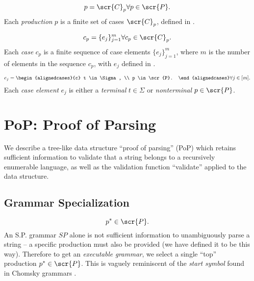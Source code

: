 \documentclass[10pt]{article}
\begin{document}
\begin{equation}
  \label{eq:p}
  p = \scr{C}_p \forall p \in \scr{P}.
\end{equation}
Each \textit{production} $p$ is a finite set of cases $\scr{C}_p$, defined in .

\begin{equation}
  \label{eq:cp}
  c_p = \{e_j\}_{j=1}^m \forall c_p \in \scr{C}_p.
\end{equation}
Each \textit{case} $c_p$ is a finite sequence of case elements $\{e_j\}_{j=1}^m$, where $m$ is the number of elements in the sequence $c_p$, with $e_j$ defined in .

\begin{equation}
  \label{eq:ej}
  e_j = \begin{alignedcases}{c}
    t \in \Sigma, \\
    p \in \scr{P}.
  \end{alignedcases} \forall j \in [m].
\end{equation}
Each \textit{case element} $e_j$ is either a \textit{terminal} $t \in \Sigma$ or \textit{nonterminal} $p \in \scr{P}$.

\section{PoP: Proof of Parsing}
\label{sec:proof-of-parsing}
We describe a tree-like data structure ``proof of parsing'' (PoP) which retains sufficient information to validate that a string belongs to a recursively enumerable language, as well as the validation function ``validate'' applied to the data structure.


\subsection{Grammar Specialization}
\label{sec:grammar-specialization}
\begin{equation}
  \label{eq:p-top}
  p^* \in \scr{P}.
\end{equation}
An S.P. grammar $SP$ alone is not sufficient information to unambiguously parse a string -- a specific production must also be provided (we have defined it to be this way). Therefore to get an \textit{executable grammar}, we select a single ``top'' production $p^* \in \scr{P}$. This is vaguely reminiscent of the \textit{start symbol} found in Chomsky grammars .
\end{document}
